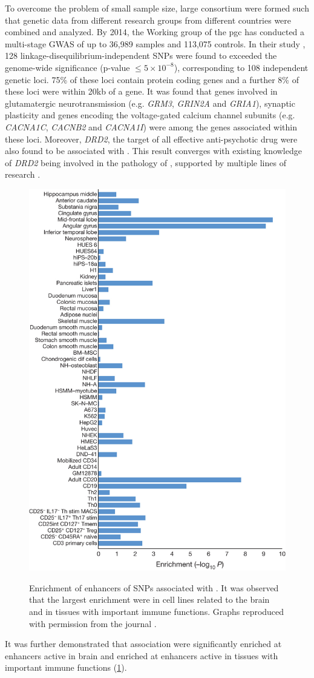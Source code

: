 	To overcome the problem of small sample size, large consortium were formed such that genetic data from different research groups from different countries were combined and analyzed.
	By 2014, the  Working group of the \gls{pgc} has conducted a multi-stage  \gls{GWAS} of up to 36,989  samples and 113,075 controls.
	In their study \citep{Ripke2014}, 128 linkage-disequilibrium-independent \glspl{SNP} were found to exceeded the genome-wide significance (p-value $\le 5\times10^{-8}$), corresponding to 108 independent genetic loci.
	75\% of these loci contain protein coding genes and a further 8\% of these loci were within 20\gls{kb} of a gene. 
	It was found that genes involved in glutamatergic neurotransmission (e.g. \textit{GRM3}, \textit{GRIN2A} and \textit{GRIA1}), synaptic plasticity and genes encoding the voltage-gated calcium channel subunits (e.g. \textit{CACNA1C}, \textit{CACNB2} and \textit{CACNA1I}) were among the genes associated within these loci.
	Moreover, \textit{DRD2}, the target of all effective anti-psychotic drug were also found to be associated with .
	This result converges with existing knowledge of \textit{DRD2} being involved in the pathology of , supported by multiple lines of research \citep{Talkowski2007}.
	\begin{figure}
		\centering
		\caption[Enrichment of enhancers of SNPs associated with Schizophrenia]{Enrichment of enhancers of SNPs associated with . 
			It was observed that the largest enrichment were in cell lines related to the brain and in tissues with important immune functions. 
			Graphs reproduced with permission from the journal \citep{Ripke2014}.}
		\includegraphics[height=\textwidth]{figure/pgc_enrichment_tissue.jpg}
		\label{fig:pgcEnrich}
	\end{figure}
	It was further demonstrated that  association were significantly enriched at enhancers active in brain and enriched at enhancers active in tissues with important immune functions (\cref{fig:pgcEnrich})\citep{Ripke2014}.
	
